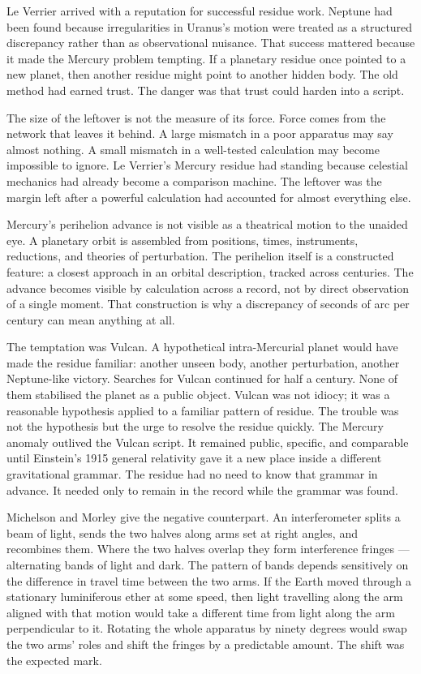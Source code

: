 Le Verrier arrived with a reputation for successful residue work. Neptune
had been found because irregularities in Uranus's motion were treated as a
structured discrepancy rather than as observational nuisance. That success
mattered because it made the Mercury problem tempting. If a planetary
residue once pointed to a new planet, then another residue might point to
another hidden body. The old method had earned trust. The danger was that
trust could harden into a script.

The size of the leftover is not the measure of its force. Force comes from
the network that leaves it behind. A large mismatch in a poor apparatus may
say almost nothing. A small mismatch in a well-tested calculation may
become impossible to ignore. Le Verrier's Mercury residue had standing
because celestial mechanics had already become a comparison machine. The
leftover was the margin left after a powerful calculation had accounted
for almost everything else.

Mercury's perihelion advance is not visible as a theatrical motion to the
unaided eye. A planetary orbit is assembled from positions, times,
instruments, reductions, and theories of perturbation. The perihelion
itself is a constructed feature: a closest approach in an orbital
description, tracked across centuries. The advance becomes visible by
calculation across a record, not by direct observation of a single moment.
That construction is why a discrepancy of seconds of arc per century can
mean anything at all.

The temptation was Vulcan. A hypothetical intra-Mercurial planet would have
made the residue familiar: another unseen body, another perturbation,
another Neptune-like victory. Searches for Vulcan continued for half a
century. None of them stabilised the planet as a public object. Vulcan was
not idiocy; it was a reasonable hypothesis applied to a familiar pattern
of residue. The trouble was not the hypothesis but the urge to resolve the
residue quickly. The Mercury anomaly outlived the Vulcan script. It
remained public, specific, and comparable until Einstein's 1915 general
relativity gave it a new place inside a different gravitational grammar.
The residue had no need to know that grammar in advance. It needed only to
remain in the record while the grammar was found.

Michelson and Morley give the negative counterpart. An interferometer
splits a beam of light, sends the two halves along arms set at right
angles, and recombines them. Where the two halves overlap they form
interference fringes --- alternating bands of light and dark. The pattern
of bands depends sensitively on the difference in travel time between the
two arms. If the Earth moved through a stationary luminiferous ether at
some speed, then light travelling along the arm aligned with that motion
would take a different time from light along the arm perpendicular to it.
Rotating the whole apparatus by ninety degrees would swap the two arms'
roles and shift the fringes by a predictable amount. The shift was the
expected mark.

